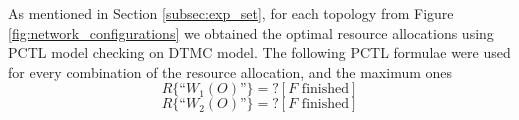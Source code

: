 \documentclass{llncs}
\begin{document}
\begin{table}
\centering
{}

\caption{Model comparison for different number of agents in a fully connected agent organisation and different models.}
\label{tab:model_sizes}
\end{table}

As mentioned in Section \ref{subsec:exp_set}, for each topology from Figure \ref{fig:network_configurations} we obtained the optimal resource allocations using PCTL model checking on DTMC model. The following PCTL formulae were used for every combination of the resource allocation, and the maximum ones
\[
R\{\mbox{``$W_1(O)$''}\}=? [F \mbox{ finished}]
\]
\[
R\{\mbox{``$W_2(O)$''}\}=? [F \mbox{ finished}]
\]
\end{document}
